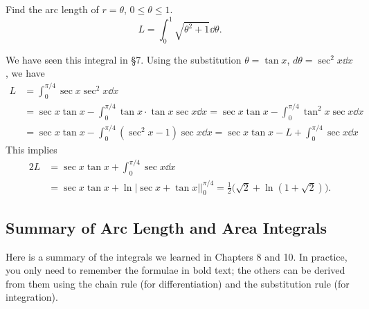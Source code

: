 \begin{ex}
    Find the arc length of $r = \theta$, $0 \leq \theta \leq 1$.
    \[
        L = \int_0^1 \sqrt{\theta^2 + 1} \dd \theta.
    \]
    
    We have seen this integral in \S7. Using the substitution $\theta = \tan x$, $d\theta = \sec^2 x \dd x$, we have
    \begin{align*}
        L &= \int_0^{\pi/4} \sec x \sec^2 x \dd x \tag{IBP with $u = \sec x$, $v = \tan x$}\\
        &= \sec x \tan x - \int_0^{\pi/4} \tan x \cdot \tan x \sec x \dd x = \sec x \tan x - \int_0^{\pi/4} \tan^2 x \sec x \dd x\\
        &= \sec x \tan x - \int_0^{\pi/4} (\sec^2 x - 1) \sec x \dd x = \sec x \tan x - L + \int_0^{\pi/4} \sec x \dd x
    \end{align*}
    This implies 
    \begin{align*}
        2L &= \sec x \tan x + \int_0^{\pi/4} \sec x \dd x\\
        &=\sec x \tan x + \ln|\sec x + \tan x| \Big|_0^{\pi/4} = \frac{1}{2}\Big(\sqrt{2}+ \ln(1+\sqrt{2})\Big). 
    \end{align*}
\end{ex}

\newpage
\subsection{Summary of Arc Length and Area Integrals}
Here is a summary of the integrals we learned in Chapters 8 and 10. In practice, you only need to remember the formulae in bold text; the others can be derived from them using the chain rule (for differentiation) and the substitution rule (for integration). 

